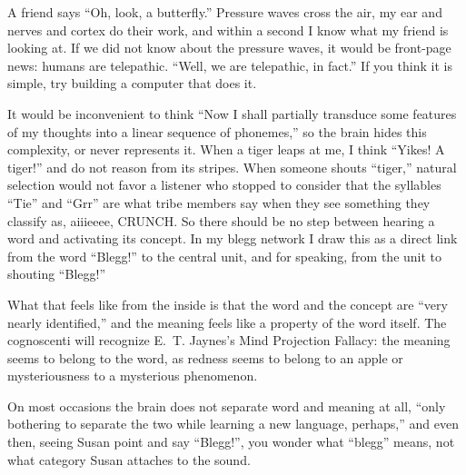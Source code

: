 
A friend says ``Oh, look, a butterfly.'' Pressure waves cross the air, my ear and nerves and cortex do their work, and within a second I know what my friend is looking at. If we did not know about the pressure waves, it would be front-page news: humans are telepathic. ``Well, we are telepathic, in fact.'' If you think it is simple, try building a computer that does it.

It would be inconvenient to think ``Now I shall partially transduce some features of my thoughts into a linear sequence of phonemes,'' so the brain hides this complexity, or never represents it. When a tiger leaps at me, I think ``Yikes! A tiger!'' and do not reason from its stripes. When someone shouts ``tiger,'' natural selection would not favor a listener who stopped to consider that the syllables ``Tie'' and ``Grr'' are what tribe members say when they see something they classify as, aiiieeee, CRUNCH. So there should be no step between hearing a word and activating its concept. In my blegg network I draw this as a direct link from the word ``Blegg!'' to the central unit, and for speaking, from the unit to shouting ``Blegg!'' 

What that feels like from the inside is that the word and the concept are ``very nearly identified,'' and the meaning feels like a property of the word itself.  The cognoscenti will recognize E.~T. Jaynes's Mind Projection Fallacy: the meaning seems to belong to the word, as redness seems to belong to an apple or mysteriousness to a mysterious phenomenon. 

On most occasions the brain does not separate word and meaning at all, ``only bothering to separate the two while learning a new language, perhaps,'' and even then, seeing Susan point and say ``Blegg!'', you wonder what ``blegg'' means, not what category Susan attaches to the sound. 


